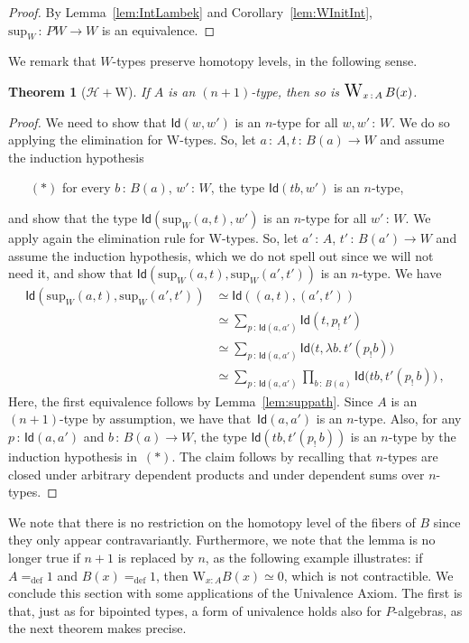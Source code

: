 \documentclass[10pt,a4paper,oneside,reqno]{amsart}
\theoremstyle{mythm}
\newtheorem{theorem}{Theorem}[section]
\theoremstyle{mydef}
\theoremstyle{myrmk}
\newcommand{\defeq}{=_{\mathrm{def}}}
\newcommand{\co}{\,{:}\,}
\newcommand{\Hint}{\mathcal{H}}
\newcommand{\Id}{\mathsf{Id}}
\newcommand{\W}{\mathrm{W}}
\DeclareMathOperator*{\WW}{\text{\Large $\mathrm{W}$}}
\renewcommand{\sup}{\mathrm{sup}}
\begin{document}
\begin{proof}
By Lemma~\ref{lem:IntLambek} and Corollary~\ref{lem:WInitInt}, $\sup_W \co PW \to W$ is an equivalence.
\end{proof}





We  remark that $W$-types  preserve homotopy levels, in the following sense.

\begin{theorem}[$\Hint + \W$]
If $A$ is an $(n+1)$-type, then so is $\WW_{x \co A} B(x)$.
\end{theorem}


\begin{proof}
We need to show that $\Id(w, w')$ is an $n$-type for all $w, w' \co W$. We do so applying the elimination for W-types.
So, let $a \co A, t \co B(a) \to W$ and assume the induction hypothesis 
\begin{itemize}
\item[$(\ast)$] for every $b \co B(a)$, $w' \co W$, the type $\Id(tb,w')$ is an $n$-type, 
\end{itemize}
and show that  the type $\Id(\sup_W(a,t), w')$ is an $n$-type for all $w' \co W$. We apply again the elimination rule for W-types. So, let   $a' \co A$, $t' \co B(a') \to W$ and assume the induction hypothesis, which we do not spell out since we will not need it, and show that $\Id( \sup_W(a,t) , \sup_W(a',t'))$ is an $n$-type. We have
\begin{align*} 
\Id(\sup_W(a,t), \sup_W(a',t'))
& \simeq \Id((a,t) , (a',t')) \\
& \simeq \sum_{p \co \Id(a, a')} \Id( t , p_{!} \, t' )   \\
& \simeq \sum_{p \co \Id(a,a')}  \Id\big(t, \lambda b. \,  t'( p_{!} b)\big) \\
& \simeq \sum_{p \co \Id(a,a')} \prod_{b \co B(a)} \Id \big( tb , t'(p_{!} \, b)\big) \, , 
\end{align*}
Here, the first equivalence follows by Lemma~\ref{lem:suppath}. Since $A$ is an $(n+1)$-type by assumption, we have 
that~$\Id(a,a')$ is an $n$-type. Also, for any $p \co \Id(a,a')$ and $b \co B(a) \to W$, the type $\Id(tb,  t'(p_{!} \, b))$ is an $n$-type by the 
induction 
hypothesis in~$(\ast)$. The claim follows by recalling that $n$-types are closed under arbitrary dependent products and under dependent 
sums over $n$-types. 
\end{proof}

We note that there is no restriction on the homotopy level of the fibers of $B$ since they only appear contravariantly. Furthermore, we note that the lemma is no longer true if $n+1$ is replaced by $n$, as the following example
illustrates: if $A \defeq 1$ and $B(x) \defeq 1$, then $\W_{x:A} B(x) \simeq 0$, which is not contractible. 
We conclude this section with some applications of the Univalence Axiom. The first is that, just as for bipointed 
types, a form of univalence holds also for $P$-algebras, as the next theorem makes precise. 
\end{document}
